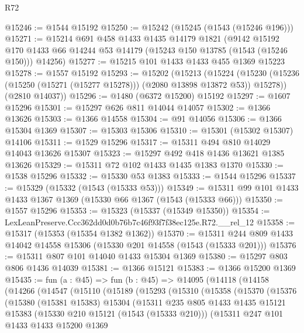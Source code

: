 \begin{lexlean}{R72}
\begin{coremodule}
@15246 := @1544 @15192
@15250 := @15242 (@15245 (@1543 (@15246 @196)))
@15271 := @15214
    @691
    @458
    @1433
    @1435
    @14179
    @1821
    (@9142
      @15192
      @170
      @1433
      @66
      @14244
      @53
      @14179
      (@15243 @150 @13785 (@1543 (@15246 @150)))
      @14256)
@15277 := @15215 @101 @1433 @1433 @455 @1369 @15223
@15278 := @1557 @15192
@15293 := @15202
    (@15213
      (@15224 (@15230 (@15236 (@15250 (@15271 (@15277 @15278))) (@2080 @13898 @13872 @53)) @15278))
      (@2810 @14037))
@15296 := @1480 (@6372 @15200) @15192
@15297 := @1607 @15296
@15301 := @15297 @626 @811 @14044 @14057
@15302 := @1366 @13626
@15303 := @1366 @14558
@15304 := @91 @14056
@15306 := @1366 @15304 @1369
@15307 := @15303 @15306
@15310 := @15301 (@15302 @15307) @14106
@15311 := @1529 @15296
@15317 := @15311 @494 @810 @14029 @14043 @13626 @15307
@15323 := @15297 @492 @418 @1436 @13621 @1385 @13626
@15329 := @15311 @72 @102 @1433 @1435 @1383 @1370
@15330 := @1538 @15296
@15332 := @15330 @53 @1383
@15333 := @1544 @15296
@15337 := @15329 (@15332 (@1543 (@15333 @53)))
@15349 := @15311 @99 @101 @1433 @1433 @1367 @1369 (@15330 @66 @1367 (@1543 (@15333 @66)))
@15350 := @1557 @15296
@15353 := @15323 (@15337 (@15349 @15350))
@15354 := LexLeanPreserve.Ccc362dd0d0b76b7c46f93f7f38ec125e.R72.__rel_12
@15358 := @15317 (@15353 (@15354 @1382 @1362))
@15370 := @15311 @244 @809 @1433 @14042 @14558 @15306 (@15330 @201 @14558 (@1543 (@15333 @201)))
@15376 := @15311 @807 @101 @14040 @1433 @15304 @1369
@15380 := @15297 @803 @806 @1436 @14039
@15381 := @1366 @15121
@15383 := @1366 @15200 @1369
@15435 := fun (a : @45) =>
  fun (b : @45) =>
  @14095
    (@14118
      (@14158
        (@14266
          (@14547
            (@15110
              (@15189
                (@15293
                  (@15310
                    (@15358
                      (@15370
                        (@15376
                          (@15380
                            (@15381 @15383)
                            @15304
                            (@15311
                              @235
                              @805
                              @1433
                              @1435
                              @15121
                              @15383
                              (@15330 @210 @15121 (@1543 (@15333 @210)))
                              (@15311
                                @247
                                @101
                                @1433
                                @1433
                                @15200
                                @1369

\end{coremodule}
\end{lexlean}
